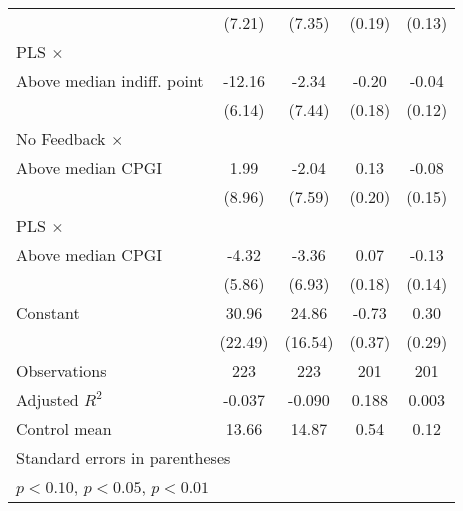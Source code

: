 \begin{table}[htbp]
\begin{tabular}{l*{4}{c}}
                &   (7.21)         &   (7.35)         &   (0.19)         &   (0.13)         \\
\addlinespace
PLS $\times$ \\ Above median indiff. point&   -12.16\sym{**} &    -2.34         &    -0.20         &    -0.04         \\
                &   (6.14)         &   (7.44)         &   (0.18)         &   (0.12)         \\
\addlinespace
No Feedback $\times$ \\ Above median CPGI&     1.99         &    -2.04         &     0.13         &    -0.08         \\
                &   (8.96)         &   (7.59)         &   (0.20)         &   (0.15)         \\
\addlinespace
PLS $\times$ \\ Above median CPGI&    -4.32         &    -3.36         &     0.07         &    -0.13         \\
                &   (5.86)         &   (6.93)         &   (0.18)         &   (0.14)         \\
\addlinespace
Constant        &    30.96         &    24.86         &    -0.73\sym{*}  &     0.30         \\
                &  (22.49)         &  (16.54)         &   (0.37)         &   (0.29)         \\
\midrule
Observations    &      223         &      223         &      201         &      201         \\
Adjusted \(R^{2}\)&   -0.037         &   -0.090         &    0.188         &    0.003         \\
Control mean    &    13.66         &    14.87         &     0.54         &     0.12         \\
\bottomrule
\multicolumn{5}{l}{\footnotesize Standard errors in parentheses}\\
\multicolumn{5}{l}{\footnotesize \sym{*} \(p<0.10\), \sym{**} \(p<0.05\), \sym{***} \(p<0.01\)}\\
\end{tabular}
\end{table}

